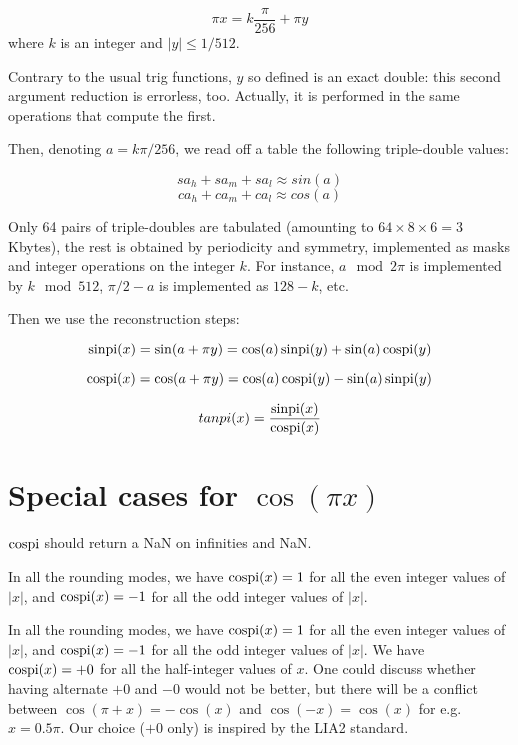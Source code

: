 \begin{equation}
  \pi x = k\frac{\pi}{256} + \pi y\label{eq:trigpiargred}
\end{equation}
where  $k$  is an integer and  $ |y| \leq {1}/{512}$.

Contrary to the usual trig functions, $y$ so defined is an exact
double: this second argument reduction is errorless, too. Actually, it
is performed in the same operations that compute the first.

Then, denoting $a=k\pi/256$, 
we read off a table the following triple-double values: 

$$sa_h+sa_m+sa_l \approx sin(a)$$
$$ca_h+ca_m+ca_l \approx cos(a)$$

Only 64 pairs of triple-doubles  are tabulated (amounting to
$64\times 8 \times 6 = 3$ Kbytes), the rest is obtained by
periodicity and symmetry, implemented as masks and integer operations
on the integer $k$. For instance,  $a\mod 2\pi$ is implemented by $k\mod 512$,
$\pi/2-a$ is implemented as $128-k$, etc.


Then we use the reconstruction steps:

\begin{equation}        
  \operatorname{sinpi}(x) = \sin(a + \pi y) =  \cos(a) \operatorname{sinpi}(y) +  \sin(a) \operatorname{cospi}(y) 
  \label{eq:sinpiapy}
\end{equation}

\begin{equation}
  \operatorname{cospi}(x) = \cos(a + \pi y) = \cos(a) \operatorname{cospi}(y) -  \sin(a) \operatorname{sinpi}(y) 
  \label{eq:cospiapy}
\end{equation}

\begin{equation} 
  tanpi(x) = \frac{\operatorname{sinpi}(x)}{\operatorname{cospi}(x)} 
  \label{eq:tanpiapy}
\end{equation}



\section{Special cases for $\cos(\pi x)$ }

$\operatorname{cospi}$ should return a NaN on infinities and NaN.

In all the rounding modes, we have $\operatorname{cospi}(x)=1$ for all the even integer
 values of $|x|$, and $\operatorname{cospi}(x)=-1$ for all the odd integer values of
 $|x|$.


 In all the rounding modes, we have $\operatorname{cospi}(x)=1$ for all the even
 integer values of $|x|$, and $\operatorname{cospi}(x)=-1$ for all the odd integer
 values of $|x|$. We have $\operatorname{cospi}(x)=+0$ for all the half-integer
 values of $x$. One could discuss whether having alternate $+0$ and
 $-0$ would not be better, but there will be a conflict between
 $\cos(\pi+x)=-\cos(x)$ and $\cos(-x)=\cos(x)$ for e.g. $x=0.5\pi$.
 Our choice ($+0$ only) is inspired by the LIA2 standard.


